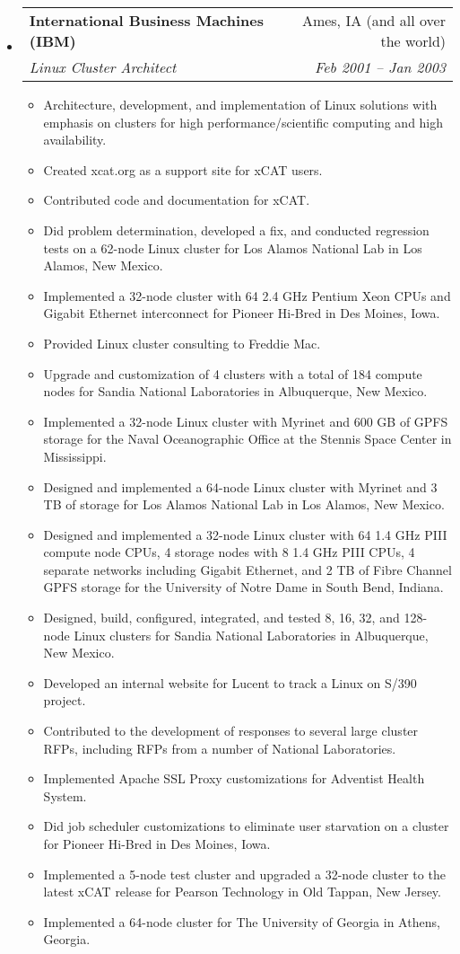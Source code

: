 \documentclass[letterpaper,10pt]{article}
\makeatletter
\newcommand{\resitem}[1]{\item #1 \vspace{-2pt}}
\newcommand{\ressubheading}[4]{
\begin{tabular*}{6.5in}{l@{\extracolsep{\fill}}r}
		\textbf{#1} & #2 \\
		\textit{#3} & \textit{#4} \\
\end{tabular*}\vspace{-6pt}}
\makeatother
\begin{document}
\begin{itemize}
\item
    \ressubheading{International Business Machines (IBM)}{Ames, IA (and all over the world)}{Linux Cluster Architect}{Feb 2001 -- Jan 2003}
    \begin{itemize}
        \resitem{Architecture, development, and implementation of Linux solutions with emphasis on clusters for high performance/scientific computing and high availability.}
        \resitem{Created xcat.org as a support site for xCAT users.}
        \resitem{Contributed code and documentation for xCAT.}
        \resitem{Did problem determination, developed a fix, and conducted regression tests on a 62-node Linux cluster for Los Alamos National Lab in Los Alamos, New Mexico.}
        \resitem{Implemented a 32-node cluster with 64 2.4 GHz Pentium Xeon CPUs and Gigabit Ethernet interconnect for Pioneer Hi-Bred in Des Moines, Iowa.}
        \resitem{Provided Linux cluster consulting to Freddie Mac.}
        \resitem{Upgrade and customization of 4 clusters with a total of 184 compute nodes for Sandia National Laboratories in Albuquerque, New Mexico.}
        \resitem{Implemented a 32-node Linux cluster with Myrinet and 600 GB of GPFS storage for the Naval Oceanographic Office at the Stennis Space Center in Mississippi.}
        \resitem{Designed and implemented a 64-node Linux cluster with Myrinet and 3 TB of storage for Los Alamos National Lab in Los Alamos, New Mexico.}
        \resitem{Designed and implemented a 32-node Linux cluster with 64 1.4 GHz PIII compute node CPUs, 4 storage nodes with 8 1.4 GHz PIII CPUs, 4 separate networks including Gigabit Ethernet, and 2 TB of Fibre Channel GPFS storage for the University of Notre Dame in South Bend, Indiana.}
        \resitem{Designed, build, configured, integrated, and tested 8, 16, 32, and 128-node Linux clusters for Sandia National Laboratories in Albuquerque, New Mexico.}
        \resitem{Developed an internal website for Lucent to track a Linux on S/390 project.}
        \resitem{Contributed to the development of responses to several large cluster RFPs, including RFPs from a number of National Laboratories.}
        \resitem{Implemented Apache SSL Proxy customizations for Adventist Health System.}
        \resitem{Did job scheduler customizations to eliminate user starvation on a cluster for Pioneer Hi-Bred in Des Moines, Iowa.}
        \resitem{Implemented a 5-node test cluster and upgraded a 32-node cluster to the latest xCAT release for Pearson Technology in Old Tappan, New Jersey.}
        \resitem{Implemented a 64-node cluster for The University of Georgia in Athens, Georgia.}

\end{itemize}
\end{itemize}
\end{document}
